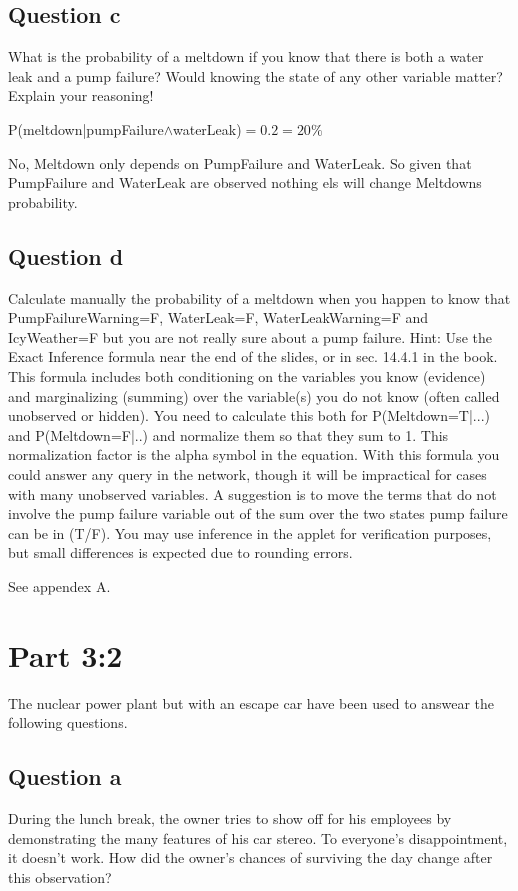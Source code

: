 \documentclass[a4paper,12pt]{article}
\begin{document}
\subsection*{Question c} 
What is the probability of a meltdown if you know that there is both a water leak and a pump failure? Would knowing the state of any other variable matter? Explain your reasoning!

P(meltdown|pumpFailure$\wedge$waterLeak)$=0.2=20\%$

No, Meltdown only depends on PumpFailure and WaterLeak. So given that PumpFailure and WaterLeak are observed nothing els will change Meltdowns probability.

\subsection*{Question d} 
Calculate manually the probability of a meltdown when you happen to know that PumpFailureWarning=F, WaterLeak=F, WaterLeakWarning=F and IcyWeather=F but you are not really sure about a pump failure. 
Hint: Use the Exact Inference formula near the end of the slides, or in sec. 14.4.1 in the book. This formula includes both conditioning on the variables you know (evidence) and marginalizing (summing) over the variable(s) you do not know (often called unobserved or hidden). You need to calculate this both for P(Meltdown=T|...) and P(Meltdown=F|..) and normalize them so that they sum to 1. This normalization factor is the alpha symbol in the equation. With this formula you could answer any query in the network, though it will be impractical for cases with many unobserved variables. A suggestion is to move the terms that do not involve the pump failure variable out of the sum over the two states pump failure can be in (T/F). You may use inference in the applet for verification purposes, but small differences is expected due to rounding errors.

See appendex A.

\section*{Part 3:2}
The nuclear power plant but with an escape car have been used to answear the following questions.

\subsection*{Question a}
During the lunch break, the owner tries to show off for his employees by demonstrating the many features of his car stereo. To everyone's disappointment, it doesn't work. How did the owner's chances of surviving the day change after this observation? 
\end{document}
